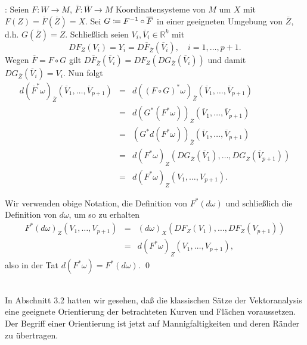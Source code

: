 \documentclass[a4paper,twoside,DIV15,BCOR12mm]{scrbook}
\begin{document}
: Seien $F: W \to M$, 
$\overline{F}: \overline{W} \to M$ Koordinatensysteme von $M$ um $X$ 
mit $F(Z) = \overline{F}(\overline{Z}) = X$. Sei $G \da  F^{-1} \circ 
\overline{F}$ in einer geeigneten Umgebung von $\overline{Z}$, d.h. 
$G(\overline{Z}) = Z$. Schließlich seien $V_{i},\overline{V}_{i} 
\in {\mathbb R}^{k}$ mit
\[ DF_{Z}(V_{i}) = Y_{i} = 
D\overline{F}_{\overline{Z}}(\overline{V}_{i}), \quad i = 
1,\dots,p+1. \]
Wegen $\overline{F} = F \circ G$ gilt 
$D\overline{F}_{\overline{Z}}(\overline{V}_{i}) = 
DF_{Z}(DG_{\overline{Z}}(\overline{V}_{i}))$ und damit 
$DG_{\overline{Z}}(\overline{V}_{i}) = V_{i}$. Nun folgt
\begin{eqnarray*}
d(\overline{F}^{*}\omega)_{\overline{Z}}(\overline{V}_{1},\dots,
\overline{V}_{p+1})  & = & d((F \circ 
G)^{*}\omega)_{\overline{Z}}(\overline{V}_{1},\dots,\overline{V}_{p+1}) 
\\
& = & 
d(G^{*}(F^{*}\omega))_{\overline{Z}}(\overline{V}_{1},\dots,
\overline{V}_{p+1}) \\
& = & (G^{*}d(F^{*}\omega))_{\overline{Z}}(\overline{V}_{1},\dots,
\overline{V}_{p+1}) \\
& = & 
d(F^{*}\omega)_{Z}(DG_{\overline{Z}}(\overline{V}_{1}),\dots,DG_{\overline{Z}}
(\overline{V}_{p+1})) \\
& = & d(F^{*}\omega)_{Z} (V_{1},\dots,V_{p+1}).
\end{eqnarray*}

\bigskip

 Wir verwenden obige Notation, 
die Definition von $F^{*}(d\omega)$ und schließlich die Definition 
von $d\omega$, um so zu erhalten
\begin{eqnarray*}
F^{*}(d\omega)_{Z}(V_{1},\dots,V_{p+1}) & = & 
(d\omega)_{X}(DF_{Z}(V_{1}),\dots,DF_{Z}(V_{p+1})) \\
& = & d(F^{*}\omega)_{Z}(V_{1},\dots,V_{p+1}),
\end{eqnarray*}
also in der Tat $d(F^{*}\omega) = F^{*}(d\omega)$.
\qed\\

\bigskip

 \\

\noindent
In Abschnitt 3.2 hatten wir gesehen, daß die klassischen Sätze der 
Vektoranalysis eine geeignete Orientierung der betrachteten Kurven und 
Flächen voraussetzen. Der Begriff einer Orientierung
 ist jetzt auf Mannigfaltigkeiten und deren 
Ränder zu übertragen.\\
\end{document}
